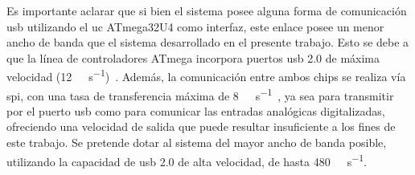 Es importante aclarar que si bien el sistema posee alguna forma de comunicación \acrshort{usb} utilizando el \acrshort{uc} ATmega32U4 como interfaz, este enlace posee un menor ancho de banda que el sistema desarrollado en el presente trabajo. Esto se debe a que la línea de controladores ATmega incorpora puertos \acrshort{usb} 2.0 de máxima velocidad (\SI{12}{\mega\bit\per\second})~\cite{Atmel2016}. Además, la comunicación entre ambos chips se realiza vía \acrshort{spi}, con una tasa de transferencia máxima de \SI{8}{\mega\bit\per\second}~\cite{Atmel2016}, ya sea para transmitir por el puerto \acrshort{usb} como para comunicar las entradas analógicas digitalizadas, ofreciendo una velocidad de salida que puede resultar insuficiente a los fines de este trabajo. Se pretende dotar al sistema del mayor ancho de banda posible, utilizando la capacidad de \acrshort{usb} 2.0 de alta velocidad, de hasta \SI{480}{\mega\bit\per\second}.